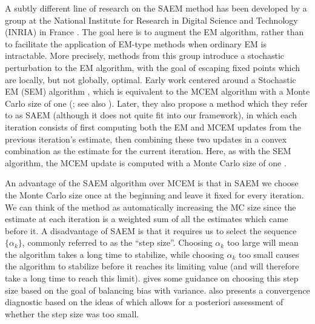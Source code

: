 \documentclass[11pt, oneside]{article}   	%
\begin{document}
A subtly different line of research on the SAEM method has been developed by a group at the National Institute for Research in Digital Science and Technology (INRIA) in France \citep[see, e.g.,][for a discussion of some of their methods]{Cel95}. The goal here is to augment the EM algorithm, rather than to facilitate the application of EM-type methods when ordinary EM is intractable. More precisely, methods from this group introduce a stochastic perturbation to the EM algorithm, with the goal of escaping fixed points which are locally, but not globally, optimal. Early work centered around a Stochastic EM (SEM) algorithm \citep{Cel85}, which is equivalent to the MCEM algorithm with a Monte Carlo size of one (\citealp{Cel87,Cel95}; see also \citealp{Nie00II}). Later, they also propose a method which they refer to as SAEM (although it does not quite fit into our framework), in which each iteration consists of first computing both the EM and MCEM updates from the previous iteration's estimate, then combining these two updates in a convex combination as the estimate for the current iteration. Here, as with the SEM algorithm, the MCEM update is computed with a Monte Carlo size of one \citep{Cel92, Cel95}.

An advantage of the SAEM algorithm over MCEM is that in SAEM we choose the Monte Carlo size once at the beginning and leave it fixed for every iteration. We can think of the method as automatically increasing the MC size since the estimate at each iteration is a weighted sum of all the estimates which came before it. A disadvantage of SAEM is that it requires us to select the sequence $\{ \alpha_k \}$, commonly referred to as the ``step size''. Choosing $\alpha_k$ too large will mean the algorithm takes a long time to stabilize, while choosing $\alpha_k$ too small causes the algorithm to stabilize before it reaches its limiting value (and will therefore take a long time to reach this limit). \citet{Jan06} gives some guidance on choosing this step size based on the goal of balancing bias with variance. \citeauthor{Jan06} also presents a convergence diagnostic based on the ideas of \citet{Caf05} which allows for a posteriori assessment of whether the step size was too small. 
\end{document}
